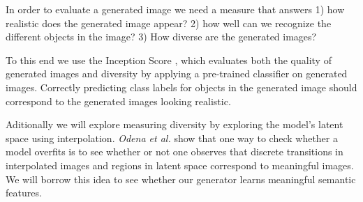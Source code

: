 \documentclass{article}
\begin{document}
In order to evaluate a generated image we need a measure that answers 1) how realistic does the generated image appear? 2) how well can we recognize the different objects in the image? 3) How diverse are the generated images?

To this end we use the Inception Score \cite{inception}, which evaluates both the quality of generated images and diversity by applying a pre-trained classifier on generated images. Correctly predicting class labels for objects in the generated image should correspond to the generated images looking realistic.

Aditionally we will explore measuring diversity by exploring the model's latent space using interpolation. \textit{Odena et al.} \cite{auxgan} show that one way to check whether a model overfits is to see whether or not one observes that discrete transitions in interpolated images and regions in latent space correspond to meaningful images. We will borrow this idea to see whether our generator learns meaningful semantic features.
\end{document}
